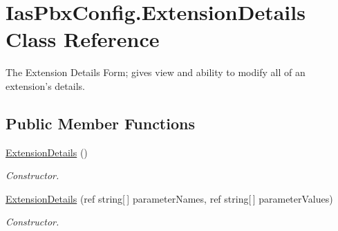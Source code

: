 \hypertarget{class_ias_pbx_config_1_1_extension_details}{
\section{IasPbxConfig.ExtensionDetails Class Reference}
\label{class_ias_pbx_config_1_1_extension_details}
}


The Extension Details Form; gives view and ability to modify all of an extension's details.  
\subsection*{Public Member Functions}
\begin{DoxyCompactItemize}
\item 
\hyperlink{class_ias_pbx_config_1_1_extension_details_a88f7f56f7241f0453d991ae96d7e392e}{ExtensionDetails} ()
\begin{DoxyCompactList}\small\item\em Constructor. \item\end{DoxyCompactList}\item 
\hyperlink{class_ias_pbx_config_1_1_extension_details_ac452ac01cadc7dff15b9eed23b94ba6e}{ExtensionDetails} (ref string\mbox{[}$\,$\mbox{]} parameterNames, ref string\mbox{[}$\,$\mbox{]} parameterValues)
\begin{DoxyCompactList}\small\item\em Constructor. \item\end{DoxyCompactList}\end{DoxyCompactItemize}
